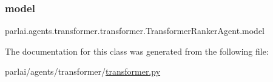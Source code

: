 \subsubsection{\texorpdfstring{model}{model}}
{\footnotesize\ttfamily parlai.\+agents.\+transformer.\+transformer.\+Transformer\+Ranker\+Agent.\+model}



The documentation for this class was generated from the following file\+:\begin{DoxyCompactItemize}
\item 
parlai/agents/transformer/\hyperlink{transformer_8py}{transformer.\+py}\end{DoxyCompactItemize}

